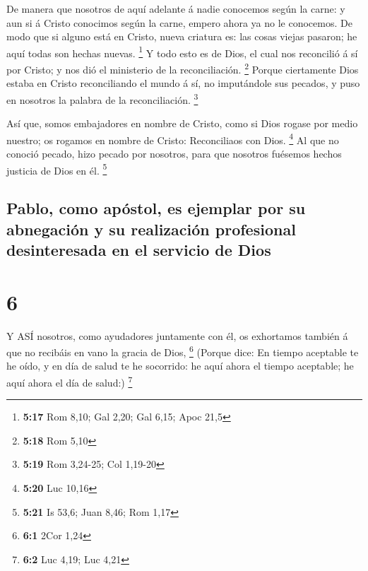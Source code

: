  De manera que nosotros de aquí adelante á nadie conocemos
según la carne: y aun si á Cristo conocimos según la carne, empero ahora
ya no le conocemos.  De modo que si alguno está en Cristo,
nueva criatura es: las cosas viejas pasaron; he aquí todas son hechas
nuevas. \footnote{\textbf{5:17} Rom 8,10; Gal 2,20; Gal 6,15; Apoc 21,5}
 Y todo esto es de Dios, el cual nos reconcilió á sí por
Cristo; y nos dió el ministerio de la reconciliación. \footnote{\textbf{5:18}
  Rom 5,10}  Porque ciertamente Dios estaba en Cristo
reconciliando el mundo á sí, no imputándole sus pecados, y puso en
nosotros la palabra de la reconciliación. \footnote{\textbf{5:19} Rom
  3,24-25; Col 1,19-20}

 Así que, somos embajadores en nombre de Cristo, como si
Dios rogase por medio nuestro; os rogamos en nombre de Cristo:
Reconciliaos con Dios. \footnote{\textbf{5:20} Luc 10,16} 
Al que no conoció pecado, hizo pecado por nosotros, para que nosotros
fuésemos hechos justicia de Dios en él. \footnote{\textbf{5:21} Is 53,6;
  Juan 8,46; Rom 1,17}

\hypertarget{pablo-como-apuxf3stol-es-ejemplar-por-su-abnegaciuxf3n-y-su-realizaciuxf3n-profesional-desinteresada-en-el-servicio-de-dios}{%
\subsection{Pablo, como apóstol, es ejemplar por su abnegación y su
realización profesional desinteresada en el servicio de
Dios}\label{pablo-como-apuxf3stol-es-ejemplar-por-su-abnegaciuxf3n-y-su-realizaciuxf3n-profesional-desinteresada-en-el-servicio-de-dios}}

\hypertarget{section-5}{%
\section{6}\label{section-5}}

 Y ASÍ nosotros, como ayudadores juntamente con él, os
exhortamos también á que no recibáis en vano la gracia de Dios,
\footnote{\textbf{6:1} 2Cor 1,24}  (Porque dice: En tiempo
aceptable te he oído, y en día de salud te he socorrido: he aquí ahora
el tiempo aceptable; he aquí ahora el día de salud:) \footnote{\textbf{6:2}
  Luc 4,19; Luc 4,21}

